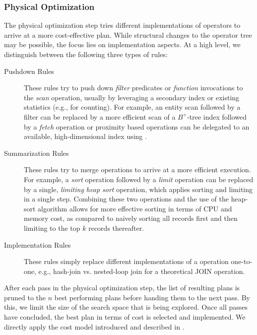 \subsubsection{Physical Optimization}

The physical optimization step tries different implementations of operators to arrive at a more cost-effective plan. While structural changes to the operator tree may be possible, the focus lies on implementation aspects.  At a high level, we distinguish between the following three types of rules:

\begin{description}
    \item[Pushdown Rules] These rules try to push down \emph{filter} predicates or \emph{function} invocations to the \emph{scan} operation, usually by leveraging a secondary index or existing statistics (e.g., for counting). For example, an entity scan followed by a filter can be replaced by a more efficient scan of a $B^{+}$-tree index followed by a \emph{fetch} operation or proximity based operations can be delegated to an available, high-dimensional index using .
 
    \item[Summarization Rules] These rules try to merge operations to arrive at a more efficient execution. For example, a \emph{sort} operation followed by a \emph{limit} operation can be replaced by a single, \emph{limiting heap sort} operation, which applies sorting and limiting in a single step. Combining these two operations and the use of the heap-sort algorithm allows for more effective sorting in terms of CPU and memory cost, as compared to naively sorting all records first and then limiting to the top $k$ records thereafter.
    
    \item[Implementation Rules] These rules simply replace different implementations of a operation one-to-one, e.g., hash-join vs. nested-loop join for a theoretical JOIN operation.
\end{description}

After each pass in the physical optimization step, the list of resulting plans is pruned to the $n$ best performing plans before handing them to the next pass. By this, we limit the size of the search space that is being explored. Once all passes have concluded, the best plan in terms of cost is selected and implemented. We directly apply the cost model introduced and described in .

